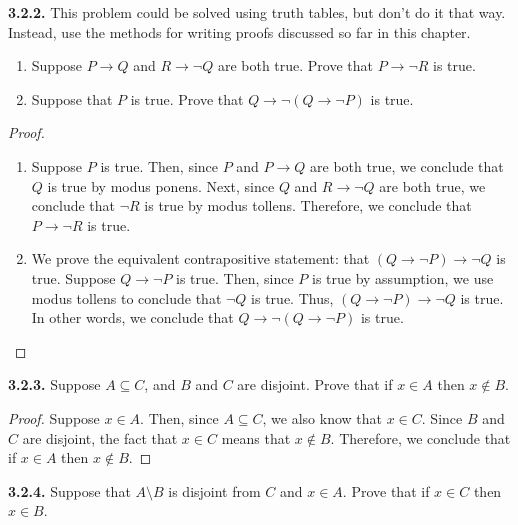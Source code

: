 \documentclass[12pt]{amsart}
\newenvironment{statement}[1]{\smallskip\noindent\color[rgb]{.6627, .3529, .6314} {\bf #1.}}{}
\theoremstyle{definition}
\theoremstyle{remark}
\begin{document}
\begin{statement}{3.2.2}
This problem could be solved using truth tables, but don't do it that way.
Instead, use the methods for writing proofs discussed so far in this chapter.
\begin{enumerate}
	\item Suppose $P \rightarrow Q$ and $R \rightarrow \neg Q$ are both true.
	Prove that $P \rightarrow \neg R$ is true.
	
	\item Suppose that $P$ is true.
	Prove that $Q \rightarrow \neg (Q \rightarrow \neg P)$ is true.
\end{enumerate}
\end{statement}

\begin{proof}
\hfill
\begin{enumerate}
	\item Suppose $P$ is true.
	Then, since $P$ and $P \rightarrow Q$ are both true, we conclude that $Q$ is true
	by modus ponens.
	Next, since $Q$ and $R \rightarrow \neg Q$ are both true, we conclude that $\neg R$
	is true by modus tollens.
	Therefore, we conclude that $P \rightarrow \neg R$ is true.
	
	\item We prove the equivalent contrapositive statement: 
	that $(Q \rightarrow \neg P) \rightarrow \neg Q$ is true.
	Suppose $Q \rightarrow \neg P$ is true.
	Then, since $P$ is true by assumption, we use modus tollens to conclude that $\neg Q$ is true.
	Thus, $(Q \rightarrow \neg P) \rightarrow \neg Q$ is true.
	In other words, we conclude that $Q \rightarrow \neg (Q \rightarrow \neg P)$ is true.
\end{enumerate}
\end{proof}


\begin{statement}{3.2.3}
Suppose $A \subseteq C$, and $B$ and $C$ are disjoint.
Prove that if $x \in A$ then $x \notin B$.
\end{statement}

\begin{proof}
Suppose $x \in A$.
Then, since $A \subseteq C$, we also know that $x \in C$.
Since $B$ and $C$ are disjoint, the fact that $x \in C$ means that $x \notin B$.
Therefore, we conclude that if $x \in A$ then $x \notin B$.
\end{proof}


\begin{statement}{3.2.4}
Suppose that $A \setminus B$ is disjoint from $C$ and $x \in A$.
Prove that if $x \in C$ then $x \in B$.
\end{statement}
\end{document}
